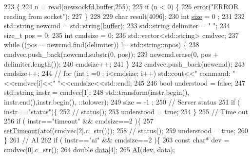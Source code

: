\begin{DoxyCode}
223                       \{
224   \hyperlink{classServer__NI6008_a5573d5feeef8372e2b31a54d6a5a19aa}{n} = read(\hyperlink{classServer__NI6008_a37e3d77925f6c6c9d7dee4dc1c8560d6}{newsockfd},\hyperlink{classServer__NI6008_a2ebf359e55794c1d5ce59900e90b54e6}{buffer},255);
225   \textcolor{keywordflow}{if} (\hyperlink{classServer__NI6008_a5573d5feeef8372e2b31a54d6a5a19aa}{n} < 0) \{
226     \hyperlink{classServer__NI6008_a7bcfa6ba683c63b68c624644ccfb8597}{error}(\textcolor{stringliteral}{"ERROR reading from socket"});
227   \}
228  
229   \textcolor{keywordtype}{char}   result[4096];
230   \textcolor{keywordtype}{int}    \hyperlink{namespacecat_a3eae50bb86a614752045105e00365a46}{size} = 0 ;
231   
232   std::string newcmd = std::string(\hyperlink{classServer__NI6008_a2ebf359e55794c1d5ce59900e90b54e6}{buffer});
233   std::string delimiter = \textcolor{stringliteral}{" "};
234   \textcolor{keywordtype}{size\_t} pos = 0;
235   \textcolor{keywordtype}{int} cmdsize = 0;
236   std::vector<std::string> cmdvec;
237   \textcolor{keywordflow}{while} ((pos = newcmd.find(delimiter)) != std::string::npos) \{
238     cmdvec.push\_back(newcmd.substr(0, pos));
239     newcmd.erase(0, pos + delimiter.length());
240     cmdsize++;
241   \}
242   cmdvec.push\_back(newcmd);
243   cmdsize++;
244   \textcolor{comment}{//  for (int i =0 ; i<cmdsize; i++) std::cout<<" command: "<<cmdvec[i]<<" "<<cmdsize<<std::endl;}
245   
246   \textcolor{keywordtype}{bool} understood = \textcolor{keyword}{false};
247   std::string instr = cmdvec[1];
248   std::transform(instr.begin(), instr.end(),instr.begin(), ::tolower);
249   size = -1 ; 
250   \textcolor{comment}{// Server status}
251   \textcolor{keywordflow}{if} ( instr==\textcolor{stringliteral}{"status"})\{
252     \textcolor{comment}{//    status();}
253     understood = \textcolor{keyword}{true};
254   \}
255   \textcolor{comment}{// Time out}
256   \textcolor{keywordflow}{if} ( instr==\textcolor{stringliteral}{"timeout"} && cmdsize==2 )\{
257     \hyperlink{classServer__NI6008_ade018df1c5afac06e6d528536635ba48}{setTimeout}(atof(cmdvec[2].c\_str()));
258     \textcolor{comment}{//    status();}
259     understood = \textcolor{keyword}{true};
260   \}
261   \textcolor{comment}{// AI}
262   \textcolor{keywordflow}{if} ( instr==\textcolor{stringliteral}{"ai"} && cmdsize==2 )\{
263     \textcolor{keyword}{const} \textcolor{keywordtype}{char}* dev = cmdvec[0].c\_str();
264     \textcolor{keywordtype}{double} \hyperlink{namespaceshell_a5ea2525995cedc3efd69ea8a7f034d1e}{data}[4];
265     \hyperlink{classServer__NI6008_a94705879717d5bcf129899e96be81675}{AI}(dev, data);

\end{DoxyCode}
